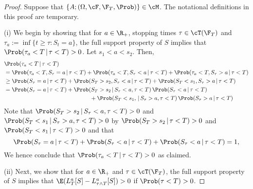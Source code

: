 \documentclass[11pt]{article}
\begin{document}
\begin{proof}

Suppose that $\{ A ; (\Omega, \cF, \F_T, \Prob) \} \in \cM$. The notational definitions in this proof are temporary. \\

\item (i) We begin by showing that for $a \in \R_+$, stopping times $\tau \in \cT(\F_T)$ and $\tau_a := \inf \{ t \geq \tau : S_t = a \}$, the full support property of $S$ implies that $\Prob( \tau_a < T \, | \, \tau < T) > 0$. Let $s_1 < a < s_2$. Then,
\begin{align*}
&\Prob( \tau_a < T \, | \, \tau < T) \\
&= \Prob( \tau_a < T, S_\tau = a \, | \, \tau < T) + \Prob( \tau_a < T, S_\tau < a \, | \, \tau < T) + \Prob( \tau_a < T, S_\tau > a \, | \, \tau < T) \\
%
%
%
&\geq \Prob( S_\tau = a \, | \, \tau < T) + \Prob( S_T > s_2, S_\tau < a \, | \, \tau < T) + \Prob( S_T < s_1, S_\tau > a \, | \, \tau < T) \\
%
%
%
&= \Prob( S_\tau = a \, | \, \tau < T) + \Prob( S_T > s_2 \, | \, S_\tau < a, \tau < T) \, \Prob(S_\tau < a \, | \, \tau < T) \\
&\hspace{150pt} + \Prob( S_T < s_1, \, | \, S_\tau > a, \tau < T) \, \Prob( S_\tau > a \, | \, \tau < T)
\end{align*}
Note that $\Prob( S_T > s_2 \, | \, S_\tau < a, \tau < T) > 0$ and $\Prob( S_T < s_1 \, | \, S_\tau > a, \tau < T) > 0$  by $\Prob(S_T > s_2 \, | \, \tau < T) > 0$ and $\Prob(S_T < s_1 \, | \, \tau < T) > 0$ and that  
$$
\Prob( S_\tau = a \, | \, \tau < T) + \Prob(S_\tau < a \, | \, \tau < T) + \Prob( S_\tau < a \, | \, \tau < T) = 1,
$$
We hence conclude that $\Prob( \tau_a < T \, | \, \tau < T) > 0$ as claimed. \\

\item (ii) Next, we show that for $a \in \R_+$ and $\tau \in \cT(\F_T)$, the full support property of $S$ implies that $\E(L^a_T[S] - L^a_{\tau \wedge T}[S]) > 0$ if $\Prob(\tau < T) > 0$.


\end{proof}
\end{document}
